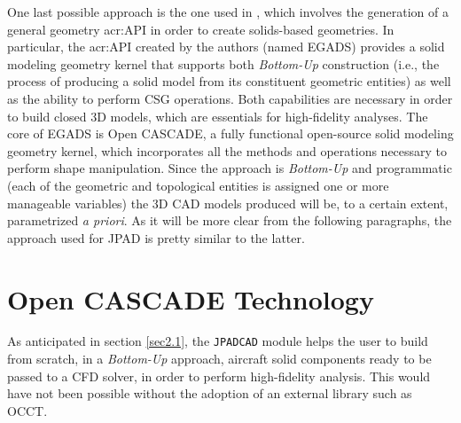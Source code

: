\bigskip
\noindent
One last possible approach is the one used in \cite{AIAApaperHaimesDrela}, which involves the generation of a general geometry \gls{acr:API} in order to create solids-based geometries. In particular, the \gls{acr:API} created by the authors (named EGADS) provides a solid modeling geometry kernel that supports both \emph{Bottom-Up} construction (i.e., the process of producing a solid model from its constituent geometric entities) as well as the ability to perform \gls{CSG} operations. Both capabilities are necessary in order to build closed 3D models, which are essentials for high-fidelity analyses. The core of EGADS is Open CASCADE, a fully functional open-source solid modeling geometry kernel, which incorporates all the methods and operations necessary to perform shape manipulation. Since the approach is \emph{Bottom-Up} and programmatic (each of the geometric and topological entities is assigned one or more manageable variables) the 3D \gls{CAD} models produced will be, to a certain extent, parametrized \emph{a priori}. As it will be more clear from the following paragraphs, the approach used for \gls{JPAD} is pretty similar to the latter.

\section{Open CASCADE Technology}
\label{sec2.2}

As anticipated in section \ref{sec2.1}, the \lstinline[language=Java]!JPADCAD! module helps the user to build from scratch, in a \emph{Bottom-Up} approach, aircraft solid components ready to be passed to a \gls{CFD} solver, in order to perform high-fidelity analysis. This would have not been possible without the adoption of an external library such as \gls{OCCT}.

